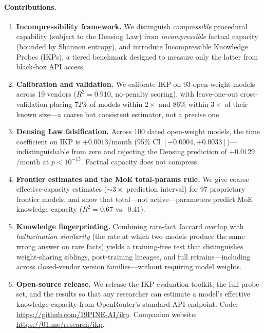 \documentclass[11pt]{article}
\begin{document}
\paragraph{Contributions.}
\begin{enumerate}[leftmargin=*]
    \item \textbf{Incompressibility framework.} We distinguish \emph{compressible} procedural capability (subject to the Densing Law) from \emph{incompressible} factual capacity (bounded by Shannon entropy), and introduce Incompressible Knowledge Probes (IKPs), a tiered benchmark designed to measure only the latter from black-box API access.
    \item \textbf{Calibration and validation.} We calibrate IKP on 93 open-weight models across 19 vendors ($R^2 = 0.910$, no-penalty scoring), with leave-one-out cross-validation placing 72\% of models within $2\times$ and 86\% within $3\times$ of their known size---a coarse but consistent estimator, not a precise one.
    \item \textbf{Densing Law falsification.} Across 100 dated open-weight models, the time coefficient on IKP is $+0.0013$/month (95\% CI $[-0.0004, +0.0033]$)---indistinguishable from zero and rejecting the Densing prediction of $+0.0129$/month at $p < 10^{-15}$. Factual capacity does not compress.
    \item \textbf{Frontier estimates and the MoE total-params rule.} We give coarse effective-capacity estimates (${\sim}3\times$ prediction interval) for 97 proprietary frontier models, and show that total---not active---parameters predict MoE knowledge capacity ($R^2 = 0.67$ vs.\ $0.41$).
    \item \textbf{Knowledge fingerprinting.} Combining rare-fact Jaccard overlap with \emph{hallucination similarity} (the rate at which two models produce the same wrong answer on rare facts) yields a training-free test that distinguishes weight-sharing siblings, post-training lineages, and full retrains---including across closed-vendor version families---without requiring model weights.
    \item \textbf{Open-source release.} We release the IKP evaluation toolkit, the full probe set, and the results so that any researcher can estimate a model's effective knowledge capacity from OpenRouter's standard API endpoint. Code: \url{https://github.com/19PINE-AI/ikp}. Companion website: \url{https://01.me/research/ikp}.
\end{enumerate}

\end{document}
